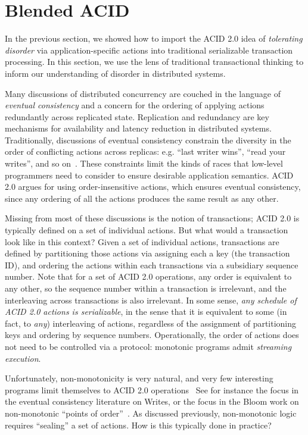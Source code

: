 \documentclass{sig-alternate}
\begin{document}
\section{Blended ACID}
In the previous section, we showed how to import the ACID 2.0 idea of \emph{tolerating disorder} via application-specific actions into traditional serializable transaction processing. In this section, we use the lens of traditional transactional thinking to inform our understanding of disorder in distributed systems.

Many discussions of distributed concurrency are couched in the language of \emph{eventual consistency} and a concern for the ordering of applying actions redundantly across replicated state.  Replication and redundancy are key mechanisms for availability and latency reduction in distributed systems.  Traditionally, discussions of eventual consistency constrain the diversity in the order of conflicting actions across replicas: e.g. ``last writer wins'', ``read your writes'', and so on~\cite{terry}.  These constraints limit the kinds of races that low-level programmers need to consider to ensure desirable application semantics.  ACID 2.0 argues for using order-insensitive actions, which ensures eventual consistency, since any ordering of all the actions produces the same result as any other.

Missing from most of these discussions is the notion of transactions; ACID 2.0 is typically defined on a set of individual actions.  But what would a transaction look like in this context?  Given a set of individual actions, transactions are defined by partitioning those actions via assigning each a key (the transaction ID), and ordering the actions within each transactions via a subsidiary sequence number.  Note that for a set of ACID 2.0 operations, any order is equivalent to any other, so the sequence number within a transaction is irrelevant, and the interleaving across transactions is also irrelevant.  In some sense, \emph{any schedule of ACID 2.0 actions is serializable}, in the sense that it is equivalent to some (in fact, to \emph{any}) interleaving of actions, regardless of the assignment of partitioning keys and ordering by sequence numbers.  Operationally, the order of actions does not need to be controlled via a protocol: monotonic programs admit \emph{streaming execution}.

Unfortunately, non-monotonicity is very natural, and very few interesting programs limit themselves to ACID 2.0 operations~\cite{There is, however, an intriguing theoretical result due independently to Immerman, Vardi and Papadimitriou that monotonic logic with sequences can express any polynomial-time computation.  In our experience to date, this is more intriguing than practical.}  See for instance the focus in the eventual consistency literature on Writes, or the focus in the Bloom work on non-monotonic ``points of order''~\cite{cidr11}.  As discussed previously, non-monotonic logic requires ``sealing'' a set of actions.  How is this typically done in practice?
\end{document}
